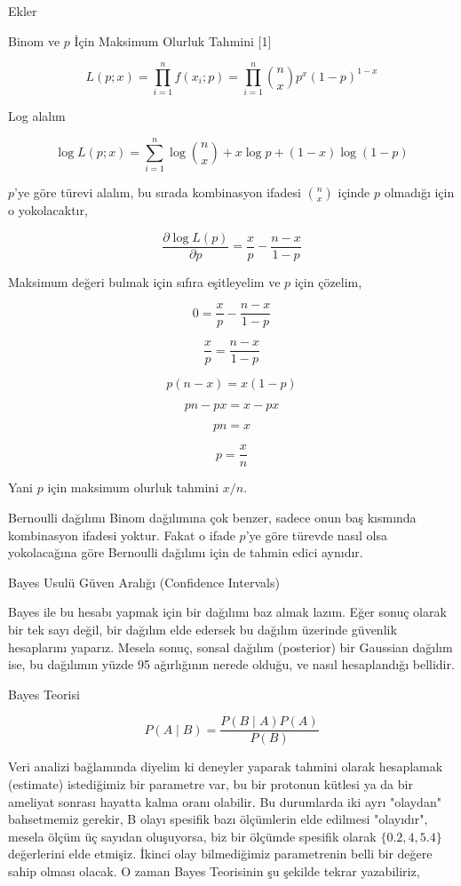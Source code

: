 \documentclass[12pt,fleqn]{article}\usepackage{../../common}
\begin{document}
Ekler

Binom ve $p$ İçin Maksimum Olurluk Tahmini [1]

$$ L(p;x) = \prod_{i=1}^n f(x_i;p) = \prod_{i=1}^n {n \choose x} p^x(1-p)^{1-x} $$

Log alalım

$$ \log L(p;x) = 
\sum_{i=1}^n \log {n \choose x} + x \log p + (1-x) \log (1-p) $$

$p$'ye göre türevi alalım, bu sırada kombinasyon ifadesi ${n \choose x}$
içinde $p$ olmadığı için o yokolacaktır,

$$ \frac{\partial \log L(p)}{\partial p} =
\frac{x}{p} - \frac{n-x}{1-p}
$$

Maksimum değeri bulmak için sıfıra eşitleyelim ve $p$ için çözelim,

$$ 0 = \frac{x}{p} - \frac{n-x}{1-p} $$

$$  \frac{x}{p} = \frac{n-x}{1-p}  $$

$$ p(n-x)  = x(1-p) $$

$$ pn - px = x-px $$

$$ pn = x $$

$$ p = \frac{x}{n} $$

Yani $p$ için maksimum olurluk tahmini $x/n$. 

Bernoulli dağılımı Binom dağılımına çok benzer, sadece onun baş kısmında
kombinasyon ifadesi yoktur. Fakat o ifade $p$'ye göre türevde nasıl olsa
yokolacağına göre Bernoulli dağılımı için de tahmin edici aynıdır.

Bayes Usulü Güven Aralığı (Confidence Intervals) 

Bayes ile bu hesabı yapmak için bir dağılımı baz almak lazım. Eğer sonuç
olarak bir tek sayı değil, bir dağılım elde edersek bu dağılım üzerinde
güvenlik hesaplarını yaparız. Mesela sonuç, sonsal dağılım (posterior) bir
Gaussian dağılım ise, bu dağılımın yüzde 95 ağırlığının nerede olduğu, ve
nasıl hesaplandığı bellidir.

Bayes Teorisi

$$ P(A \mid B)  = \frac{P(B \mid A)P(A)}{P(B)} $$

Veri analizi bağlamında diyelim ki deneyler yaparak tahmini olarak
hesaplamak (estimate) istediğimiz bir parametre var, bu bir protonun
kütlesi ya da bir ameliyat sonrası hayatta kalma oranı olabilir. Bu
durumlarda iki ayrı "olaydan" bahsetmemiz gerekir, B olayı spesifik bazı
ölçümlerin elde edilmesi "olayıdır", mesela ölçüm üç sayıdan oluşuyorsa,
biz bir ölçümde spesifik olarak $\{0.2,4,5.4\}$ değerlerini elde
etmişiz. İkinci olay bilmediğimiz parametrenin belli bir değere sahip
olması olacak. O zaman Bayes Teorisinin şu şekilde tekrar yazabiliriz, 
\end{document}
